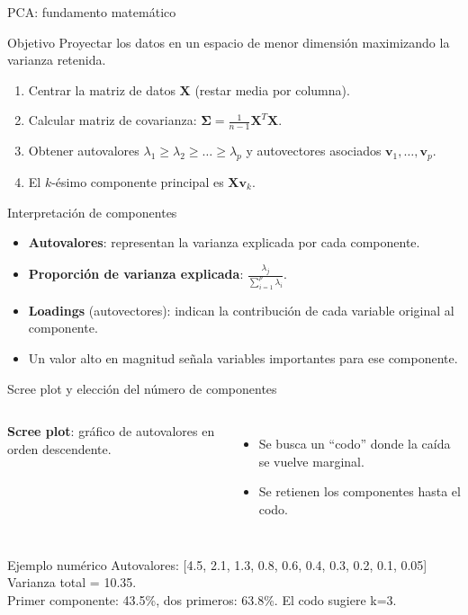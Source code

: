 \documentclass[aspectratio=169, 10pt, xcolor=table]{beamer}
\begin{document}
\begin{frame}{PCA: fundamento matemático}
    \begin{block}{Objetivo}
        Proyectar los datos en un espacio de menor dimensión maximizando la varianza retenida.
    \end{block}
    \begin{enumerate}
        \item Centrar la matriz de datos $\mathbf{X}$ (restar media por columna).
        \item Calcular matriz de covarianza: $\displaystyle \mathbf{\Sigma} = \frac{1}{n-1}\mathbf{X}^T\mathbf{X}$.
        \item Obtener autovalores $\lambda_1 \ge \lambda_2 \ge \dots \ge \lambda_p$ y autovectores asociados $\mathbf{v}_1, \dots, \mathbf{v}_p$.
        \item El $k$-ésimo componente principal es $\mathbf{X}\mathbf{v}_k$.
    \end{enumerate}
\end{frame}

\begin{frame}{Interpretación de componentes}
    \begin{itemize}
        \item \textbf{Autovalores}: representan la varianza explicada por cada componente.
        \item \textbf{Proporción de varianza explicada}: $\displaystyle \frac{\lambda_j}{\sum_{i=1}^p \lambda_i}$.
        \item \textbf{Loadings} (autovectores): indican la contribución de cada variable original al componente.
        \item Un valor alto en magnitud señala variables importantes para ese componente.
    \end{itemize}
\end{frame}

\begin{frame}{Scree plot y elección del número de componentes}
    \begin{columns}[t]
        \textbf{Scree plot}: gráfico de autovalores en orden descendente.
        \begin{itemize}
            \item Se busca un ``codo'' donde la caída se vuelve marginal.
            \item Se retienen los componentes hasta el codo.
        \end{itemize}
    \end{columns}
    \vspace{0.3cm}
    \begin{exampleblock}{Ejemplo numérico}
        Autovalores: [4.5, 2.1, 1.3, 0.8, 0.6, 0.4, 0.3, 0.2, 0.1, 0.05] \\
        Varianza total = 10.35. \\
        Primer componente: 43.5\%, dos primeros: 63.8\%. El codo sugiere k=3.
    \end{exampleblock}
\end{frame}
\end{document}
